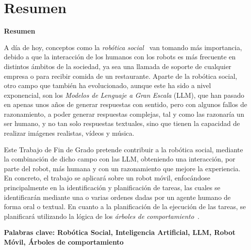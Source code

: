 \documentclass[../main.tex]{subfiles}
\begin{document}
\makeatletter
\renewenvironment{abstract}{%
    \if@twocolumn
      \section*{Resumen \\}%
    \else %
    \begin{flushright}
        {\filleft\Huge\bfseries\fontsize{48pt}{12}\selectfont Resumen\vspace{\z@}}%
        \end{flushright}
      \quotation
    \fi}
    {\if@twocolumn\else\endquotation\fi}
\makeatother
\makeatletter
\renewenvironment{abstract}{%
    \if@twocolumn
      \section*{Resumen \\}%
    \else %
    \begin{flushright}
        {\filleft\Huge\bfseries\fontsize{48pt}{12}\selectfont Resumen\vspace{\z@}}%
        \end{flushright}
      \quotation
    \fi}
    {\if@twocolumn\else\endquotation\fi}
\makeatother
\begin{abstract}

A día de hoy, conceptos como la \textit{robótica social}~\cite{canete2024multimodal} van tomando más importancia, debido a que la interacción de los humanos con los robots es más frecuente en distintos ámbitos de la sociedad, ya sea una llamada de soporte de cualquier empresa o para recibir comida de un restaurante. Aparte de la robótica social, otro campo que también ha evolucionado, aunque este ha sido a nivel exponencial, son los \textit{Modelos de Lenguaje a Gran Escala} (LLM), que han pasado en apenas unos años de generar respuestas con sentido, pero con algunos fallos de razonamiento, a poder generar respuestas complejas, tal y como las razonaría un ser humano, y no tan solo respuestas textuales, sino que tienen la capacidad de realizar imágenes realistas, vídeos y música.

Este Trabajo de Fin de Grado pretende contribuir a la robótica social, mediante la combinación de dicho campo con las LLM, obteniendo una interacción, por parte del robot, más humana y con un razonamiento que mejore la experiencia. En concreto, el trabajo se aplicará sobre un robot móvil, enfocándose principalmente en la identificación y planificación de  tareas, las cuales se identificarán mediante una o varias ordenes dadas por un agente humano de forma oral o textual. En cuanto a la planificación de la ejecución de las tareas, se planificará utilizando la lógica de los \textit{árboles de comportamiento}~\cite{ogren2022behavior}.

\bfseries{\large{Palabras clave:}} Robótica Social, Inteligencia Artificial, LLM, Robot Móvil, Árboles de comportamiento

\end{abstract}
\end{document}
